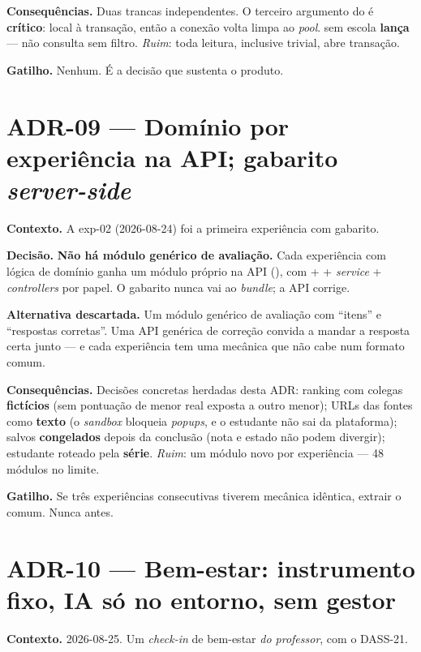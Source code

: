 \textbf{Consequências.} Duas trancas independentes. O terceiro argumento
 do  é \textbf{crítico}: local à transação, então a
conexão volta limpa ao \emph{pool}.  sem escola \textbf{lança} ---
não consulta sem filtro. \emph{Ruim}: toda leitura, inclusive trivial, abre
transação.

\textbf{Gatilho.} Nenhum. É a decisão que sustenta o produto.

\section{ADR-09 --- Domínio por experiência na API; gabarito \emph{server-side}}

\textbf{Contexto.} A exp-02 (2026-08-24) foi a primeira experiência com gabarito.

\textbf{Decisão.} \textbf{Não há módulo genérico de avaliação.} Cada experiência
com lógica de domínio ganha um módulo próprio na API (), com
 +  + \emph{service} + \emph{controllers} por
papel. O gabarito nunca vai ao \emph{bundle}; a API corrige.

\textbf{Alternativa descartada.} Um módulo genérico de avaliação com
\enquote{itens} e \enquote{respostas corretas}. Uma API genérica de correção
convida a mandar a resposta certa junto --- e cada experiência tem uma mecânica
que não cabe num formato comum.

\textbf{Consequências.} Decisões concretas herdadas desta ADR: ranking com
colegas \textbf{fictícios} (sem pontuação de menor real exposta a outro menor);
URLs das fontes como \textbf{texto} (o \emph{sandbox} bloqueia \emph{popups}, e o
estudante não sai da plataforma); salvos \textbf{congelados} depois da conclusão
(nota e estado não podem divergir); estudante roteado pela \textbf{série}.
\emph{Ruim}: um módulo novo por experiência --- 48 módulos no limite.

\textbf{Gatilho.} Se três experiências consecutivas tiverem mecânica idêntica,
extrair o comum. Nunca antes.

\section{ADR-10 --- Bem-estar: instrumento fixo, IA só no entorno, sem gestor}

\textbf{Contexto.} 2026-08-25. Um \emph{check-in} de bem-estar \emph{do
professor}, com o DASS-21.

